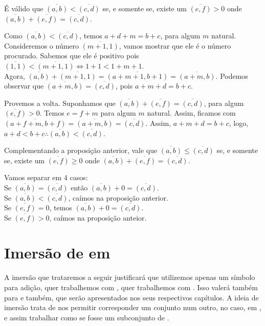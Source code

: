 \documentclass[../main.tex]{subfiles}
\begin{document}
\begin{prop}
    É válido que $\overline{(a,b)} < \overline{(c,d)}$ se, e somente se, existe um $\overline{(e,f)} > 0$ onde $\overline{(a,b)} + \overline{(e,f)} = \overline{(c,d)}$.
\end{prop}
\begin{dem}
    Como $\overline{(a,b)} < \overline{(c,d)}$, temos $a+d + m = b+c$, para algum $m$ natural. Consideremos o número $\overline{(m+1, 1)}$, vamos mostrar que ele é o número procurado. Sabemos que ele é positivo pois $\overline{(1,1)} < \overline{(m+1, 1)} \iff 1+1 < 1+m+1 $. \\
    Agora, $\overline{(a,b)} + \overline{(m+1,1)} = \overline{(a+m+1,b+1)} = \overline{(a+m, b)}$.
    Podemos observar que $\overline{(a+m, b)} = \overline{(c,d)}$, pois $a+m+d = b+c$.

    Provemos a volta. Suponhamos que $\overline{(a,b)} + \overline{(e,f)} = \overline{(c,d)}$, para algum $\overline{(e,f)} > 0$. Temos $e=f+m$ para algum $m$ natural. Assim, ficamos com $\overline{(a+f+m, b+f)} = \overline{(a+m, b)} = \overline{(c,d)}$. Assim, $a+m+d = b+c$, logo, $a+d < b+c 
    \therefore \overline{(a,b)} < \overline{(c,d)}$.
\end{dem}

\begin{prop}
    Complementando a proposição anterior, vale que $\overline{(a,b)} \leq \overline{(c,d)}$ se, e somente se, existe um $\overline{(e,f)} \geq 0$ onde $\overline{(a,b)} + \overline{(e,f)} = \overline{(c,d)}$.
\end{prop}
\begin{dem}
    Vamos separar em 4 casos: \\
    Se $\overline{(a,b)} = \overline{(c,d)}$ então $\overline{(a,b)} + 0 = \overline{(c,d)}$. \\ 
    Se $\overline{(a,b)} < \overline{(c,d)}$, caímos na proposição anterior. \\
    Se $\overline{(e,f)} = 0$, temos $\overline{(a,b)} + 0 = \overline{(c,d)}$. \\
    Se $\overline{(e,f)} > 0$, caímos na proposição anteior.
\end{dem}

\section{Imersão de \N em \Z}
A imersão que trataremos a seguir justificará que utilizemos apenas um símbolo para adição, quer trabalhemos com \N, quer trabalhemos com \Z. Isso valerá também para \Q e \R também, que serão apresentados nos seus respectivos capítulos. A ideia de imersão trata de nos permitir corresponder um conjunto num outro, no caso, \N em \Z, e assim trabalhar como se \N fosse um subconjunto de \Z.
\end{document}

